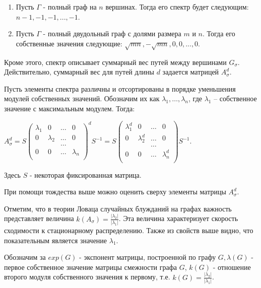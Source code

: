 \documentclass[a4paper,12pt]{report}
\theoremstyle{plain} %
\theoremstyle{definition}
\theoremstyle{remark}
\begin{document}
\begin{large}
\begin{enumerate}
\item Пусть $\Gamma$ - полный граф на $n$ вершинах. Тогда его спектр будет следующим: $n-1,-1,-1,...,-1$.

\item Пусть $\Gamma$ - полный двудольный граф  с долями размера $m$ и $n$. Тогда его собственные значения следующие: $\sqrt{mn}, -\sqrt{mn},0,0,...,0.$

\end{enumerate}

Кроме этого, спектр описывает суммарный вес путей между вершинами $G_{\sigma}$. Действительно, суммарный вес для путей длины $d$ задается матрицей $A_{\sigma}^d$.

Пусть элементы спектра различны и отсортированы в порядке уменьшения модулей собственных значений. Обозначим их как $\lambda_1,\ldots, \lambda_n$, где $\lambda_1$ -- собственное значение с максимальным модулем. Тогда:

$A_{\sigma}^d = S \begin{pmatrix} 
\lambda_1 & 0 & \ldots & 0\\ 
0 & \lambda_2 & \ldots & 0\\
  &     & \ldots &\\
0 &  0  & \ldots & \lambda_n\\
\end{pmatrix}^d S^{-1} =  S \begin{pmatrix} 
\lambda^d_1 & 0 & \ldots & 0\\ 
0 & \lambda^d_2 & \ldots & 0\\
  &     & \ldots &\\
0 &  0  & \ldots & \lambda^d_n\\
\end{pmatrix} S^{-1}.$

Здесь $S$ - некоторая фиксированная матрица. 

При помощи тождества выше можно оценить сверху элементы матрицы $A_{\sigma}^d$.

Отметим, что в теории Ловаца  случайных блужданий на графах \cite{lovasz_walks} важность представляет величина $k(A_{\sigma}) = \frac{|\lambda_2|}{|\lambda_1|}$. Эта величина характеризует скорость сходимости к стационарному распределению. Также из свойств выше видно, что показательным является значение $\lambda_1$. 

Обозначим за $exp(G)$ - экспонент матрицы, построенной по графу $G, \lambda(G)$ - первое  собственное значение матрицы смежности графа $G$, $k(G)$ - отношение второго модуля собственного значения к первому, т.е. $k(G) = \frac{|\lambda_2|}{|\lambda_1|}$.


\end{large}
\end{document}

